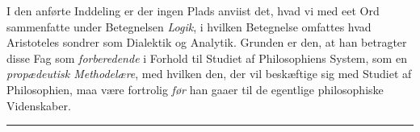 \documentclass[12pt,a4paper]{book}
\newcommand{\divrule}{\begin{center}\rule{2cm}{0.4pt}\end{center}}
\begin{document}
I den anførte Inddeling er der ingen Plads anviist det,
hvad vi med eet Ord sammenfatte under Betegnelsen \emph{Logik},
i hvilken Betegnelse omfattes hvad Aristoteles sondrer som
Dialektik og Analytik. Grunden er den, at han betragter disse
Fag som \emph{forberedende} i Forhold til Studiet af Philosophiens
System, som en \emph{propædeutisk Methodelære}, med hvilken
den, der vil beskæftige sig med Studiet af Philosophien, maa
være fortrolig \emph{før} han gaaer til de egentlige philosophiske
Videnskaber.

\divrule
\end{document}
